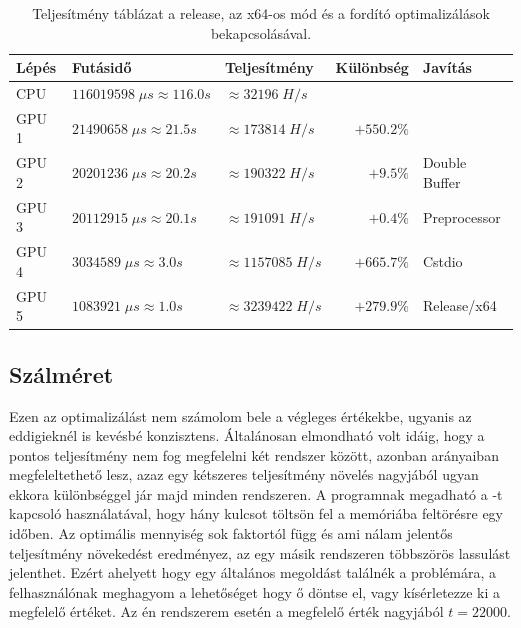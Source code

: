 \begin{table}[H]
    \centering
    \begin{tabular}{l|l|l|r|l}
        \textbf{Lépés} & \textbf{Futásidő} & \textbf{Teljesítmény} & \textbf{Különbség} & \textbf{Javítás} \\
        \hline
        \hline
        
        CPU & $\num{116 019 598} \; \mu s \approx \num{116.0}s $ & $\approx \num{32 196} \; H/s$ & & \\
        \hline
                            
        GPU 1 & $\num{21 490 658} \; \mu s \approx \num{21.5}s $ & $\approx \num{173 814} \; H/s$ & $+550.2\%$ & \\
        \hline
        
        GPU 2 & $\num{20 201 236} \; \mu s \approx \num{20.2}s $ & $\approx \num{190 322} \; H/s$ & $+9.5\%$ & Double Buffer \\
        \hline
        
        GPU 3 & $\num{20 112 915} \; \mu s \approx \num{20.1}s $ & $\approx \num{191 091} \; H/s$ & $+0.4\%$ & Preprocessor \\
        \hline
        
        GPU 4 & $\num{3 034 589} \; \mu s \approx \num{3.0}s $ & $\approx \num{1 157 085} \; H/s$ & $+665.7\%$ & Cstdio \\
        \hline
        
        GPU 5 & $\num{1 083 921} \; \mu s \approx \num{1.0}s $ & $\approx \num{3 239 422} \; H/s$ & $+279.9\%$ & Release/x64 \\
        \hline
    \end{tabular}
    \caption{Teljesítmény táblázat a release, az x64-os mód és a fordító optimalizálások bekapcsolásával.}
\end{table}




\subsection{Szálméret}

Ezen az optimalizálást nem számolom bele a végleges értékekbe, ugyanis az eddigieknél is kevésbé konzisztens. Általánosan elmondható volt idáig, hogy a pontos teljesítmény nem fog megfelelni két rendszer között, azonban arányaiban megfeleltethető lesz, azaz egy kétszeres teljesítmény növelés nagyjából ugyan ekkora különbséggel jár majd minden rendszeren.
A programnak megadható a -t kapcsoló használatával, hogy hány kulcsot töltsön fel a memóriába feltörésre egy időben. Az optimális mennyiség sok faktortól függ és ami nálam jelentős teljesítmény növekedést eredményez, az egy másik rendszeren többszörös lassulást jelenthet. Ezért ahelyett hogy egy általános megoldást találnék a problémára, a felhasználónak meghagyom a lehetőséget hogy ő döntse el, vagy kísérletezze ki a megfelelő értéket.
Az én rendszerem esetén a megfelelő érték nagyjából $t = \num{22000}$.

